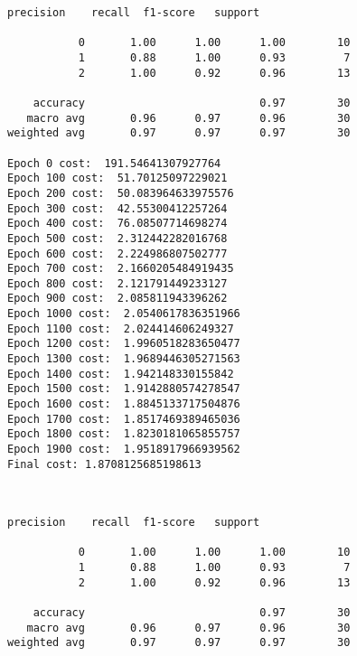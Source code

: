 \documentclass[11pt]{article}
\begin{document}
    \begin{Verbatim}[commandchars=\\\{\}]
              precision    recall  f1-score   support

           0       1.00      1.00      1.00        10
           1       0.88      1.00      0.93         7
           2       1.00      0.92      0.96        13

    accuracy                           0.97        30
   macro avg       0.96      0.97      0.96        30
weighted avg       0.97      0.97      0.97        30

Epoch 0 cost:  191.54641307927764
Epoch 100 cost:  51.70125097229021
Epoch 200 cost:  50.083964633975576
Epoch 300 cost:  42.55300412257264
Epoch 400 cost:  76.08507714698274
Epoch 500 cost:  2.312442282016768
Epoch 600 cost:  2.224986807502777
Epoch 700 cost:  2.1660205484919435
Epoch 800 cost:  2.121791449233127
Epoch 900 cost:  2.085811943396262
Epoch 1000 cost:  2.0540617836351966
Epoch 1100 cost:  2.024414606249327
Epoch 1200 cost:  1.9960518283650477
Epoch 1300 cost:  1.9689446305271563
Epoch 1400 cost:  1.942148330155842
Epoch 1500 cost:  1.9142880574278547
Epoch 1600 cost:  1.8845133717504876
Epoch 1700 cost:  1.8517469389465036
Epoch 1800 cost:  1.8230181065855757
Epoch 1900 cost:  1.9518917966939562
Final cost: 1.8708125685198613

    \end{Verbatim}

    \begin{center}
    \end{center}
    { \hspace*{\fill} \\}
    
    \begin{Verbatim}[commandchars=\\\{\}]
              precision    recall  f1-score   support

           0       1.00      1.00      1.00        10
           1       0.88      1.00      0.93         7
           2       1.00      0.92      0.96        13

    accuracy                           0.97        30
   macro avg       0.96      0.97      0.96        30
weighted avg       0.97      0.97      0.97        30


    \end{Verbatim}
\end{document}
